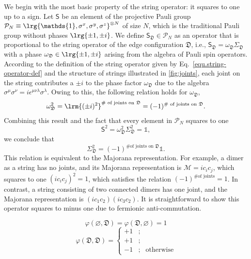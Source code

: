 We begin with the most basic property of the string operator: it squares to one up to a sign. Let $\mathsf{S}$ be an element of the projective Pauli group $\mathcal{P}_N \equiv \lrg{\mathds{1}, \sigma^x, \sigma^y, \sigma^z}^{\otimes N}$ of size $N$, which is the traditional Pauli group without phases $\lrg{\pm 1, \pm i}$. We define $\mathsf{S}_{\mathfrak{D}} \in \mathcal{P}_N$ as an operator that is proportional to the string operator of the edge configuration $\mathfrak{D}$, i.e., $\mathsf{S}_\mathfrak{D} = \omega_\mathfrak{D} \Sigma_\mathfrak{D}$ with a phase $\omega_\mathfrak{D}\in\lrg{\pm1, \pm i}$ arising from the algebra of Pauli spin operators. According to the definition of the string operator given by Eq.~\eqref{equ.string-operator-def}
and the structure of strings illustrated in \autoref{fig:joints}, each joint on the string contributes a $\pm i$ to the phase factor $\omega_\mathfrak{D}$ due to the algebra $\sigma^\mu\sigma^\nu = i\epsilon^{\mu\nu\lambda}\sigma^\lambda$. Owing to this, the following relation holds for $\omega_\mathfrak{D}$,
\[
\omega_\mathfrak{D}^2 = \lrm{(\pm i)^{2}}^{\text{\# of joints on $\mathfrak{D}$}} = (-1)^{\text{\# of joints on $\mathfrak{D}$}}.
\]
Combining this result and the fact that every element in $\mathcal{P}_N$ squares to one
\[
\mathsf{S}^2 = \omega_\mathfrak{D}^2\Sigma_\mathfrak{D}^2  = \mathds{1},
\]
we conclude that 
\begin{equation}\label{eq:sigma-joints}
    \Sigma_\mathfrak{D}^2 = (-1)^{\text{\# of joints on $\mathfrak{D}$}} \mathds{1}.
\end{equation}
This relation is equivalent to the Majorana representation. For example, a dimer as a string has no joints, and its Majorana representation is $\mathcal{M} = ic_ic_j$, which squares to one $(ic_ic_j)^2 = 1$, which satisfies the relation $(-1)^{\text{\# of joints}} = 1$. In contrast, a string consisting of two connected dimers has one joint, and the Majorana representation is $(ic_1c_2)(ic_3c_2)$. It is straightforward to show this operator squares to minus one due to fermionic anti-commutation. 

\begin{equation}\label{eq:phi-self-with-vacuum}
    \varphi(\varnothing, \mathfrak{D}) = \varphi(\mathfrak{D}, \varnothing) = 1
\end{equation}
\begin{equation}\label{eq:phi-self-with-vacuum}
    \varphi(\mathfrak{D},\mathfrak{D}) = 
    \left\{
    \begin{array}{ccc}
        +1 &; &  \\
        +1 &; &  \\
        -1 &; & \text{otherwise}
    \end{array}
    \right.
\end{equation}
